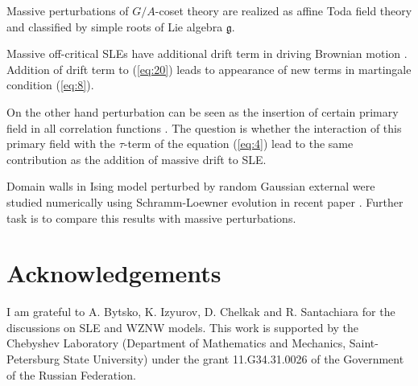 \documentclass{jetpl}
\newcommand{\gf}{\mathfrak{g}}
\begin{document}
Massive perturbations of $G/A$-coset theory are realized as affine Toda field theory and classified by simple roots of Lie algebra $\gf$. 

Massive off-critical SLEs have additional drift term in driving Brownian motion \cite{makarov2010off}. Addition of drift term to (\ref{eq:20}) leads to appearance of new terms in martingale condition (\ref{eq:8}).

On the other hand perturbation can be seen as the insertion of certain primary field in all correlation functions \cite{hollowood1989rational}. The question is whether the interaction of this primary field with the $\tau$-term of the equation (\ref{eq:4}) lead to the same contribution as the addition of massive drift to SLE. 

Domain walls in  Ising model perturbed by random Gaussian external were studied numerically using Schramm-Loewner evolution in recent paper \cite{stevenson2011domain}. Further task is to compare this results with massive perturbations. 


\section*{Acknowledgements}
\label{sec:acknowledgements}
 I am grateful to A. Bytsko, K. Izyurov, D. Chelkak and R. Santachiara for the discussions on SLE and WZNW models. This work  is supported by
the Chebyshev Laboratory (Department of Mathematics and Mechanics,
Saint-Petersburg State University) under the grant 11.G34.31.0026
of the Government of the Russian Federation.
\end{document}

